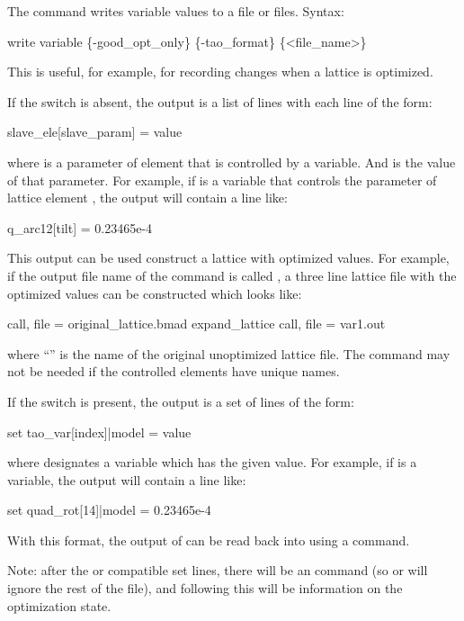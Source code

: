 {{{{{{{{{{{The  command writes \tao variable values to a file or files.
Syntax:
\begin{example}
  write variable \{-good_opt_only\} \{-tao_format\} \{<file_name>\} 
\end{example}
This is useful, for example, for recording changes when a lattice is optimized.

If the  switch is absent, the output is a list of lines with each line of the form:
\begin{example}
  slave_ele[slave_param] = value
\end{example}
where  is a parameter of \bmad element  that is controlled by a \tao
variable. And  is the value of that parameter. For example, if  is a \tao
variable that controls the  parameter of \bmad lattice element , the output
will contain a line like:
\begin{example}
  q_arc12[tilt] = 0.23465e-4
\end{example}
This output can be used construct a lattice with optimized values. For example, if the output file
name of the  command is called , a three line lattice file with the
optimized values can be constructed which looks like:
\begin{example}
  call, file = original_lattice.bmad
  expand_lattice
  call, file = var1.out
\end{example}
where ``'' is the name of the original unoptimized lattice file. The
 command may not be needed if the controlled \bmad elements have unique names.

If the  switch is present, the output is a set of lines of the form:
\begin{example}
  set tao_var[index]|model = value
\end{example}
where  designates a \tao variable which has the given  value. For
example, if  is a \tao variable, the output
will contain a line like:
\begin{example}
  set quad_rot[14]|model = 0.23465e-4
\end{example}
With this format, the output of  can be read back into \tao using a 
command.

Note: after the \bmad or \tao compatible set lines, there will be an  command (so \bmad
or \tao will ignore the rest of the file), and following this will be information on the
optimization state.

}}}}}}}}}}}
